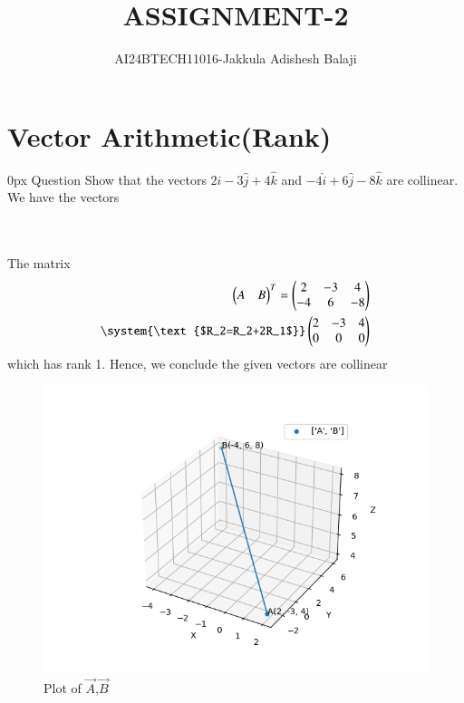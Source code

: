 \documentclass[journal]{IEEEtran}
\begin{document}

\renewcommand{\thefigure}{\theenumi}
\renewcommand{\thetable}{\theenumi}
\setlength{\intextsep}{10pt} %
\renewcommand{\thetable}{\theenumi}
\title{ASSIGNMENT-2}
\author{AI24BTECH11016-Jakkula Adishesh Balaji}
\maketitle
\bigskip
\section*{\textbf{Vector Arithmetic(Rank)}}
         \parindent 0px
         Question Show that the vectors $2\hat{i}-3\hat{j}+4\hat{k}$ and $-4\hat{i}+6\hat{j}-8\hat{k}$ are collinear.\\
\solution We have the vectors \\ \\
         \begin{table}[h!]
         
         \label{tab1.6.2.2}
         \end{table}
\\  
The matrix 
         \begin{align*}
         {\myvec{A&B}}^{T} =
         \myvec{2&-3&4\\-4&6&-8} \\
         \system{\text{$R_2=R_2+2R_1$}}
         \myvec{2&-3&4\\0&0&0}\\
         \end{align*}
         which has rank 1. Hence, we conclude the given vectors are collinear
         \begin{figure}[h]
           \centering
           \includegraphics[width=\columnwidth]{figs/fig.png}
           \caption{Plot of $\vec{A}$,$\vec{B}$}
 \end{figure}
\end{document}

